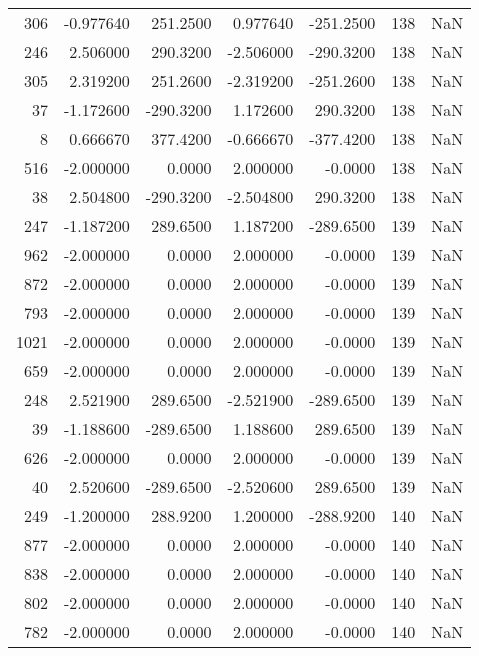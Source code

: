 \begin{tabular}{rrrrrrr}
 306 &   -0.977640 &  251.2500 &    0.977640 &   -251.2500 &         138 & NaN \\
 246 &    2.506000 &  290.3200 &   -2.506000 &   -290.3200 &         138 & NaN \\
 305 &    2.319200 &  251.2600 &   -2.319200 &   -251.2600 &         138 & NaN \\
  37 &   -1.172600 & -290.3200 &    1.172600 &    290.3200 &         138 & NaN \\
   8 &    0.666670 &  377.4200 &   -0.666670 &   -377.4200 &         138 & NaN \\
 516 &   -2.000000 &    0.0000 &    2.000000 &     -0.0000 &         138 & NaN \\
  38 &    2.504800 & -290.3200 &   -2.504800 &    290.3200 &         138 & NaN \\
 247 &   -1.187200 &  289.6500 &    1.187200 &   -289.6500 &         139 & NaN \\
 962 &   -2.000000 &    0.0000 &    2.000000 &     -0.0000 &         139 & NaN \\
 872 &   -2.000000 &    0.0000 &    2.000000 &     -0.0000 &         139 & NaN \\
 793 &   -2.000000 &    0.0000 &    2.000000 &     -0.0000 &         139 & NaN \\
1021 &   -2.000000 &    0.0000 &    2.000000 &     -0.0000 &         139 & NaN \\
 659 &   -2.000000 &    0.0000 &    2.000000 &     -0.0000 &         139 & NaN \\
 248 &    2.521900 &  289.6500 &   -2.521900 &   -289.6500 &         139 & NaN \\
  39 &   -1.188600 & -289.6500 &    1.188600 &    289.6500 &         139 & NaN \\
 626 &   -2.000000 &    0.0000 &    2.000000 &     -0.0000 &         139 & NaN \\
  40 &    2.520600 & -289.6500 &   -2.520600 &    289.6500 &         139 & NaN \\
 249 &   -1.200000 &  288.9200 &    1.200000 &   -288.9200 &         140 & NaN \\
 877 &   -2.000000 &    0.0000 &    2.000000 &     -0.0000 &         140 & NaN \\
 838 &   -2.000000 &    0.0000 &    2.000000 &     -0.0000 &         140 & NaN \\
 802 &   -2.000000 &    0.0000 &    2.000000 &     -0.0000 &         140 & NaN \\
 782 &   -2.000000 &    0.0000 &    2.000000 &     -0.0000 &         140 & NaN \\

\end{tabular}
